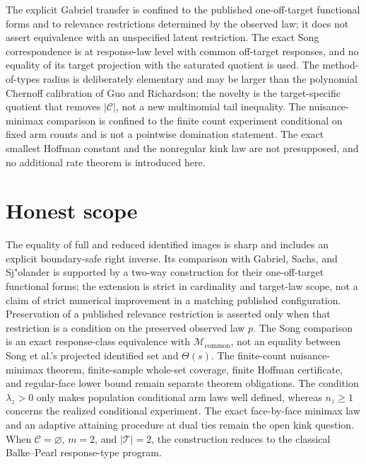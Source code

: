 \documentclass{article}
\begin{document}
The explicit Gabriel transfer is confined to the published one-off-target functional forms and to relevance restrictions determined by the observed law; it does not assert equivalence with an unspecified latent restriction.  The exact Song correspondence is at response-law level with common off-target responses, and no equality of its target projection with the saturated quotient is used.  The method-of-types radius is deliberately elementary and may be larger than the polynomial Chernoff calibration of Guo and Richardson; the novelty is the target-specific quotient that removes \( |\mathcal C| \), not a new multinomial tail inequality.  The nuisance-minimax comparison is confined to the finite count experiment conditional on fixed arm counts and is not a pointwise domination statement.  The exact smallest Hoffman constant and the nonregular kink law are not presupposed, and no additional rate theorem is introduced here.

\section{Honest scope}

The equality of full and reduced identified images is sharp and includes an explicit boundary-safe right inverse.  Its comparison with Gabriel, Sachs, and Sj"olander is supported by a two-way construction for their one-off-target functional forms; the extension is strict in cardinality and target-law scope, not a claim of strict numerical improvement in a matching published configuration.  Preservation of a published relevance restriction is asserted only when that restriction is a condition on the preserved observed law \(p\).  The Song comparison is an exact response-class equivalence with \(\mathcal M_{\mathrm{common}}\), not an equality between Song et al.'s projected identified set and \(\Theta(s)\).  The finite-count nuisance-minimax theorem, finite-sample whole-set coverage, finite Hoffman certificate, and regular-face lower bound remain separate theorem obligations.  The condition \(\lambda_z>0\) only makes population conditional arm laws well defined, whereas \(n_z\ge1\) concerns the realized conditional experiment.  The exact face-by-face minimax law and an adaptive attaining procedure at dual ties remain the open kink question.  When \(\mathcal C=\varnothing\), \(m=2\), and \(|\mathcal T|=2\), the construction reduces to the classical Balke--Pearl response-type program.
\end{document}
